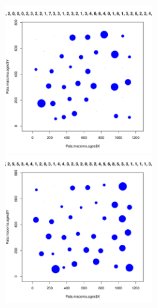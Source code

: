 \documentclass[12pt, a4paper]{disser}
\begin{document}
	\begin{figure}[h]

	\begin{minipage}[b]{.46\linewidth}
	\begin{center}
		\includegraphics[width=65mm]{./Pala_macoma_age_bubb_N7_.pdf}
	\end{center}
	\end{minipage}
%
	\hfil %
%
	\begin{minipage}[b]{.46\linewidth}
	\begin{center}
		\includegraphics[width=65mm]{./Pala_macoma_age_bubb_N8_.pdf}
	\end{center}
	\end{minipage}


\end{figure}
\end{document}
